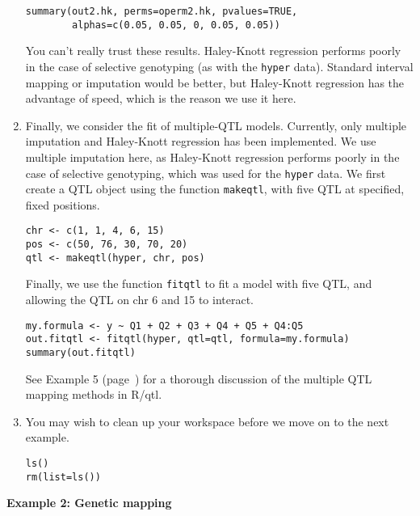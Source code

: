 \documentclass[10pt,letterpaper]{article}
\newcommand{\usercolor}{\color [named]{BlueViolet}}
\begin{document}
\begin{enumerate}
\usercolor
\verb|summary(out2.hk, perms=operm2.hk, pvalues=TRUE,| \\
\verb|        alphas=c(0.05, 0.05, 0, 0.05, 0.05))|
\normalcolor

You can't really trust these results.  Haley-Knott regression performs
poorly in the case of selective genotyping (as with the \verb-hyper-
data).  Standard interval mapping or imputation would be better, but
Haley-Knott regression has the advantage of speed, which is the reason
we use it here.

\item Finally, we consider the fit of multiple-QTL models.  Currently,
only multiple imputation and Haley-Knott regression has been
implemented.  We use multiple imputation here, as Haley-Knott
regression performs poorly in the case of selective genotyping,
which was used for the \verb-hyper- data.  We first create a QTL
object using the function \verb-makeqtl-, with five QTL at
specified, fixed positions.

\usercolor
\verb|chr <- c(1, 1, 4, 6, 15)| \\
\verb|pos <- c(50, 76, 30, 70, 20)| \\
\verb|qtl <- makeqtl(hyper, chr, pos)|
\normalcolor

Finally, we use the function \verb-fitqtl- to fit a model with five
QTL, and allowing the QTL on chr 6 and 15 to interact.

\usercolor
\verb|my.formula <- y ~ Q1 + Q2 + Q3 + Q4 + Q5 + Q4:Q5| \\ 
\verb|out.fitqtl <- fitqtl(hyper, qtl=qtl, formula=my.formula)| \\ %
\verb|summary(out.fitqtl)|
\normalcolor

See Example 5 (page~\pageref{example5}) for a thorough discussion of
the multiple QTL mapping methods in R/qtl.

\item You may wish to clean up your workspace before we move on to the
next example.

\usercolor 
\verb|ls()| \\ 
\verb|rm(list=ls())| 
\normalcolor

\end{enumerate}







\vspace{12pt}
\noindent \textbf{Example 2: Genetic mapping} \vspace{6pt}
\nopagebreak
\end{document}
